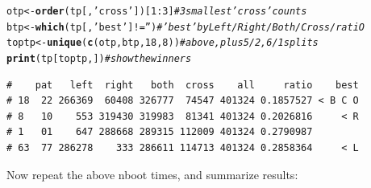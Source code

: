 \documentclass{article}\usepackage[]{graphicx}\usepackage[]{color}
\makeatletter
\newcommand{\hlnum}[1]{\textcolor[rgb]{0.686,0.059,0.569}{#1}}%
\newcommand{\hlstr}[1]{\textcolor[rgb]{0.192,0.494,0.8}{#1}}%
\newcommand{\hlcom}[1]{\textcolor[rgb]{0.678,0.584,0.686}{\textit{#1}}}%
\newcommand{\hlopt}[1]{\textcolor[rgb]{0,0,0}{#1}}%
\newcommand{\hlstd}[1]{\textcolor[rgb]{0.345,0.345,0.345}{#1}}%
\newcommand{\hlkwb}[1]{\textcolor[rgb]{0.69,0.353,0.396}{#1}}%
\newcommand{\hlkwd}[1]{\textcolor[rgb]{0.737,0.353,0.396}{\textbf{#1}}}%
\newenvironment{kframe}{%
 \def\at@end@of@kframe{}%
 \ifinner\ifhmode%
  \def\at@end@of@kframe{\end{minipage}}%
  \begin{minipage}{\columnwidth}%
 \fi\fi%
 \def\FrameCommand##1{\hskip\@totalleftmargin \hskip-\fboxsep
 \colorbox{shadecolor}{##1}\hskip-\fboxsep
     \hskip-\linewidth \hskip-\@totalleftmargin \hskip\columnwidth}%
 \MakeFramed {\advance\hsize-\width
   \@totalleftmargin\z@ \linewidth\hsize
   \@setminipage}}%
 {\par\unskip\endMakeFramed%
 \at@end@of@kframe}
\newenvironment{knitrout}{}{} %
\makeatother
\begin{document}
\begin{knitrout}\footnotesize
{}\color{fgcolor}\begin{kframe}
\begin{alltt}
\hlstd{otp} \hlkwb{<-} \hlkwd{order}\hlstd{(tp[,}\hlstr{'cross'}\hlstd{])[}\hlnum{1}\hlopt{:}\hlnum{3}\hlstd{]}    \hlcom{# 3 smallest 'cross' counts}
\hlstd{btp} \hlkwb{<-} \hlkwd{which}\hlstd{(tp[,}\hlstr{'best'}\hlstd{]} \hlopt{!=} \hlstr{''}\hlstd{)}    \hlcom{# 'best' by Left/Right/Both/Cross/ratiO}
\hlstd{toptp} \hlkwb{<-} \hlkwd{unique}\hlstd{(}\hlkwd{c}\hlstd{(otp,btp,}\hlnum{18}\hlstd{,}\hlnum{8}\hlstd{))}   \hlcom{# above, plus 5/2, 6/1 splits}
\hlkwd{print}\hlstd{(tp[toptp,])}                  \hlcom{# show the winners}
\end{alltt}
\begin{verbatim}
#    pat   left  right   both  cross    all     ratio    best
# 18  22 266369  60408 326777  74547 401324 0.1857527 < B C O
# 8   10    553 319430 319983  81341 401324 0.2026816     < R
# 1   01    647 288668 289315 112009 401324 0.2790987        
# 63  77 286278    333 286611 114713 401324 0.2858364     < L
\end{verbatim}
\end{kframe}
\end{knitrout}

Now repeat the above nboot times, and summarize results:
\end{document}
